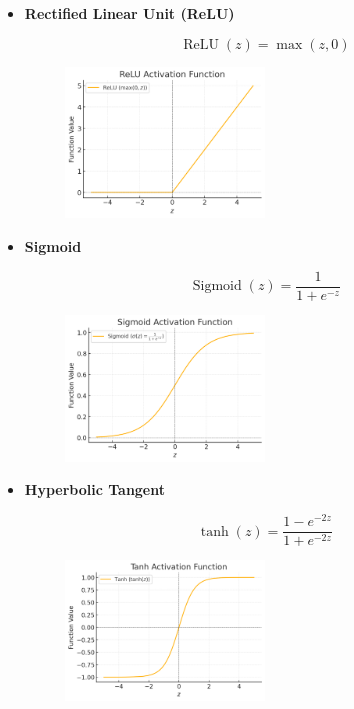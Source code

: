 \documentclass{report}
\begin{document}
\begin{definition}
    \begin{itemize}
        \item
        \textbf{Rectified Linear Unit (ReLU)}

        $$
        \operatorname{ReLU}(z)=\max (z, 0)
        $$

        \begin{figure}[H]
            \centering
            \includegraphics[width=0.5\textwidth]{.././assets/4.3.png}
        \end{figure}
        \item
        \textbf{Sigmoid}

        $$
        \operatorname{Sigmoid}(z)=\frac{1}{1+e^{-z}}
        $$

        \begin{figure}[H]
            \centering
            \includegraphics[width=0.5\textwidth]{.././assets/4.4.png}
        \end{figure}
        \item
        \textbf{Hyperbolic Tangent}

        $$
        \tanh (z)=\frac{1-e^{-2 z}}{1+e^{-2 z}}
        $$

        \begin{figure}[H]
            \centering
            \includegraphics[width=0.5\textwidth]{.././assets/4.5.png}
        \end{figure}
    \end{itemize}
\end{definition}
\end{document}
